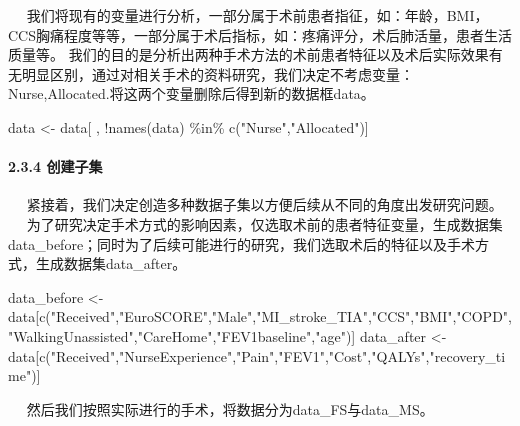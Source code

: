 \documentclass[
]{article}
\newenvironment{Shaded}{\begin{snugshade}}{\end{snugshade}}
\newcommand{\FunctionTok}[1]{\textcolor[rgb]{0.00,0.00,0.00}{#1}}
\newcommand{\NormalTok}[1]{#1}
\newcommand{\OtherTok}[1]{\textcolor[rgb]{0.56,0.35,0.01}{#1}}
\newcommand{\SpecialCharTok}[1]{\textcolor[rgb]{0.00,0.00,0.00}{#1}}
\newcommand{\StringTok}[1]{\textcolor[rgb]{0.31,0.60,0.02}{#1}}
\begin{document}
 
我们将现有的变量进行分析，一部分属于术前患者指征，如：年龄，BMI，CCS胸痛程度等等，一部分属于术后指标，如：疼痛评分，术后肺活量，患者生活质量等。
我们的目的是分析出两种手术方法的术前患者特征以及术后实际效果有无明显区别，通过对相关手术的资料研究，我们决定不考虑变量：Nurse,Allocated.将这两个变量删除后得到新的数据框data。

\begin{Shaded}
\begin{Highlighting}[]
\NormalTok{data }\OtherTok{\textless{}{-}}\NormalTok{ data[ , }\SpecialCharTok{!}\FunctionTok{names}\NormalTok{(data) }\SpecialCharTok{\%in\%} \FunctionTok{c}\NormalTok{(}\StringTok{"Nurse"}\NormalTok{,}\StringTok{"Allocated"}\NormalTok{)]}
\end{Highlighting}
\end{Shaded}

\hypertarget{ux521bux5efaux5b50ux96c6}{%
\paragraph{2.3.4 创建子集}\label{ux521bux5efaux5b50ux96c6}}

  紧接着，我们决定创造多种数据子集以方便后续从不同的角度出发研究问题。\\
 
为了研究决定手术方式的影响因素，仅选取术前的患者特征变量，生成数据集data\_before；同时为了后续可能进行的研究，我们选取术后的特征以及手术方式，生成数据集data\_after。

\begin{Shaded}
\begin{Highlighting}[]
\NormalTok{data\_before }\OtherTok{\textless{}{-}}\NormalTok{ data[}\FunctionTok{c}\NormalTok{(}\StringTok{"Received"}\NormalTok{,}\StringTok{"EuroSCORE"}\NormalTok{,}\StringTok{"Male"}\NormalTok{,}\StringTok{"MI\_stroke\_TIA"}\NormalTok{,}\StringTok{"CCS"}\NormalTok{,}\StringTok{"BMI"}\NormalTok{,}\StringTok{"COPD"}\NormalTok{,}\StringTok{"WalkingUnassisted"}\NormalTok{,}\StringTok{"CareHome"}\NormalTok{,}\StringTok{"FEV1baseline"}\NormalTok{,}\StringTok{"age"}\NormalTok{)]}
\NormalTok{data\_after }\OtherTok{\textless{}{-}}\NormalTok{ data[}\FunctionTok{c}\NormalTok{(}\StringTok{"Received"}\NormalTok{,}\StringTok{"NurseExperience"}\NormalTok{,}\StringTok{"Pain"}\NormalTok{,}\StringTok{"FEV1"}\NormalTok{,}\StringTok{"Cost"}\NormalTok{,}\StringTok{"QALYs"}\NormalTok{,}\StringTok{"recovery\_time"}\NormalTok{)]}
\end{Highlighting}
\end{Shaded}

  然后我们按照实际进行的手术，将数据分为data\_FS与data\_MS。
\end{document}
